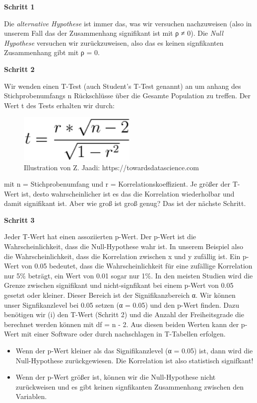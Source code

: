 \documentclass[
]{article}
\providecommand{\tightlist}{%
  \setlength{\itemsep}{0pt}\setlength{\parskip}{0pt}}
\begin{document}
\textbf{Schritt 1}

Die \emph{alternative Hypothese} ist immer das, was wir versuchen nachzuweisen (also in unserem Fall das der Zusammenhang signifikant ist mit ρ ≠ 0). Die \emph{Null Hypothese} versuchen wir zurückzuweisen, also das es keinen signfikanten Zusammenhang gibt mit ρ = 0.

\textbf{Schritt 2}

Wir wenden einen T-Test (auch Student's T-Test genannt) an um anhang des Stichprobenumfangs n Rückschlüsse über die Gesamte Population zu treffen. Der Wert t des Tests erhalten wir durch:

\begin{figure}

{\centering \includegraphics[width=2.22in]{images/059} 

}

\caption{Illustration von Z. Jaadi: https://towardsdatascience.com}\label{fig:unnamed-chunk-264}
\end{figure}

mit n = Stichprobenumfang und r = Korrelationskoeffizient. Je größer der T-Wert ist, desto wahrscheinlicher ist es das die Korrelation wiederholbar und damit signifikant ist. Aber wie groß ist groß genug? Das ist der nächste Schritt.

\textbf{Schritt 3}

Jeder T-Wert hat einen assoziierten p-Wert. Der p-Wert ist die Wahrscheinlichkeit, dass die Null-Hypothese wahr ist. In unserem Beispiel also die Wahrscheinlichkeit, dass die Korrelation zwischen x und y zufällig ist. Ein p-Wert von 0.05 bedeutet, dass die Wahrscheinlichkeit für eine zufällige Korrelation nur 5\% beträgt, ein Wert von 0.01 sogar nur 1\%. In den meisten Studien wird die Grenze zwischen signifikant und nicht-signfikant bei einem p-Wert von 0.05 gesetzt oder kleiner. Dieser Bereich ist der Signifikanzbereich α. Wir können unser Signfikanzlevel bei 0.05 setzen (α = 0.05) und den p-Wert finden. Dazu benötigen wir (i) den T-Wert (Schritt 2) und die Anzahl der Freiheitsgrade die berechnet werden können mit df = n - 2. Aus diesen beiden Werten kann der p-Wert mit einer Software oder durch nachschlagen in T-Tabellen erfolgen.

\begin{itemize}
\tightlist
\item
  Wenn der p-Wert kleiner als das Signifikanzlevel (α = 0.05) ist, dann wird die Null-Hypothese zurückgewiesen. Die Korrelation ist also statistisch signifkant!
\item
  Wenn der p-Wert größer ist, können wir die Null-Hypothese nicht zurückweisen und es gibt keinen signfikanten Zusammenhang zwischen den Variablen.
\end{itemize}
\end{document}
